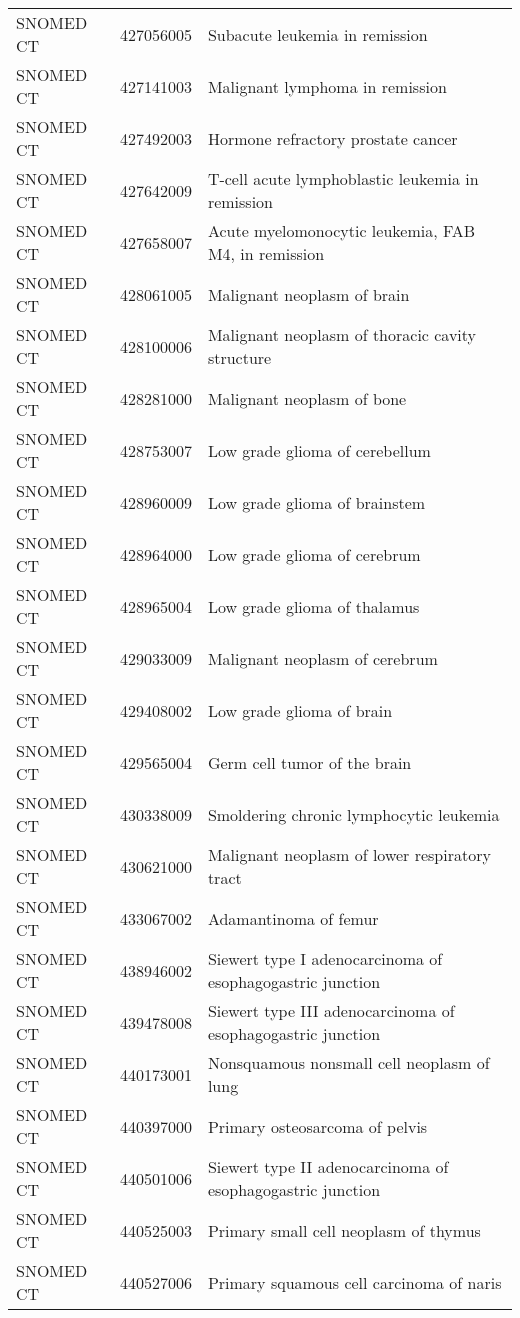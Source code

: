 \begin{longtable}{p{}p{}p{}}
  SNOMED CT & 427056005 & Subacute leukemia in remission \\ 
  SNOMED CT & 427141003 & Malignant lymphoma in remission \\ 
  SNOMED CT & 427492003 & Hormone refractory prostate cancer \\ 
  SNOMED CT & 427642009 & T-cell acute lymphoblastic leukemia in remission \\ 
  SNOMED CT & 427658007 & Acute myelomonocytic leukemia, FAB M4, in remission \\ 
  SNOMED CT & 428061005 & Malignant neoplasm of brain \\ 
  SNOMED CT & 428100006 & Malignant neoplasm of thoracic cavity structure \\ 
  SNOMED CT & 428281000 & Malignant neoplasm of bone \\ 
  SNOMED CT & 428753007 & Low grade glioma of cerebellum \\ 
  SNOMED CT & 428960009 & Low grade glioma of brainstem \\ 
  SNOMED CT & 428964000 & Low grade glioma of cerebrum \\ 
  SNOMED CT & 428965004 & Low grade glioma of thalamus \\ 
  SNOMED CT & 429033009 & Malignant neoplasm of cerebrum \\ 
  SNOMED CT & 429408002 & Low grade glioma of brain \\ 
  SNOMED CT & 429565004 & Germ cell tumor of the brain \\ 
  SNOMED CT & 430338009 & Smoldering chronic lymphocytic leukemia \\ 
  SNOMED CT & 430621000 & Malignant neoplasm of lower respiratory tract \\ 
  SNOMED CT & 433067002 & Adamantinoma of femur \\ 
  SNOMED CT & 438946002 & Siewert type I adenocarcinoma of esophagogastric junction \\ 
  SNOMED CT & 439478008 & Siewert type III adenocarcinoma of esophagogastric junction \\ 
  SNOMED CT & 440173001 & Nonsquamous nonsmall cell neoplasm of lung \\ 
  SNOMED CT & 440397000 & Primary osteosarcoma of pelvis \\ 
  SNOMED CT & 440501006 & Siewert type II adenocarcinoma of esophagogastric junction \\ 
  SNOMED CT & 440525003 & Primary small cell neoplasm of thymus \\ 
  SNOMED CT & 440527006 & Primary squamous cell carcinoma of naris \\ 

\end{longtable}
